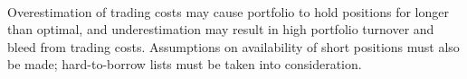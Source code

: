 \documentclass[a4paper,oneside,openany]{book}
\begin{document}
\begin{remark} \\
Overestimation of trading costs may cause portfolio to hold positions for longer than optimal, and underestimation may result in high portfolio turnover and bleed from trading costs. Assumptions on availability of short positions must also be made; hard-to-borrow lists must be taken into consideration.
\end{remark}
\end{document}
